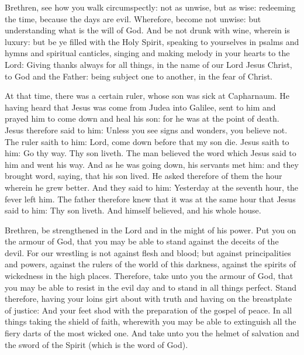 \begin{multicols}{2}
\bigskip



Brethren, see how you walk circumspectly: not as
unwise,
but as wise: redeeming the time, because the days are evil.
Wherefore, become not unwise: but understanding what is the will
of God.
And be not drunk with wine, wherein is luxury: but be ye filled
with the Holy Spirit,
speaking to yourselves in psalms and hymns and spiritual
canticles, singing and making melody in your hearts to the Lord:
Giving thanks always for all things, in the name of our Lord Jesus
Christ, to God and the Father:
being subject one to another, in the fear of Christ.



At that time, %
there was a certain ruler, whose son was sick at
Capharnaum.
He having heard that Jesus was come from Judea into Galilee, sent
to him and prayed him to come down and heal his son: for he was at the
point of death.
Jesus therefore said to him: Unless you see signs and wonders, you
believe not.
The ruler saith to him: Lord, come down before that my son die.
Jesus saith to him: Go thy way. Thy son liveth. The man believed
the word which Jesus said to him and went his way.
And as he was going down, his servants met him: and they brought
word, saying, that his son lived.
He asked therefore of them the hour wherein he grew better.  And
they said to him: Yesterday at the seventh hour, the fever left him.
The father therefore knew that it was at the same hour that Jesus
said to him: Thy son liveth. And himself believed, and his whole house.


\bigskip



Brethren, be strengthened in the Lord and in the might of
his power.
Put you on the armour of God, that you may be able to stand
against the deceits of the devil.
For our wrestling is not against flesh and blood; but against
principalities and powers, against the rulers of the world of this
darkness, against the spirits of wickedness in the high places.
Therefore, take unto you the armour of God, that you may be able
to resist in the evil day and to stand in all things perfect.
Stand therefore, having your loins girt about with truth and
having on the breastplate of justice:
And your feet shod with the preparation of the gospel of peace.
In all things taking the shield of faith, wherewith you may be
able to extinguish all the fiery darts of the most wicked one.
And take unto you the helmet of salvation and the sword of the
Spirit (which is the word of God).



\end{multicols}
